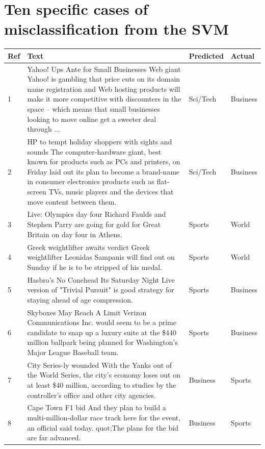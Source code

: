 \documentclass[12pt,a4paper,english]{article}
\begin{document}
\section{Ten specific cases of misclassification from the SVM}

\begin{table}[!h]
\begin{longtable}{| m{2em} | m{25em} | m{5em} | m{5em} |}
        \hline
        \textbf{Ref} & \textbf{Text} & \textbf{Predicted} & \textbf{Actual} \\ \hline

        \label{ref1} 1  & Yahoo! Ups Ante for Small Businesses Web giant Yahoo! is gambling that price cuts on its domain name registration and Web hosting products will make it more competitive with discounters in the space -- which means that small businesses looking to move online get a sweeter deal through ... & Sci/Tech & Business \\ \hline
\label{ref2} 2 & HP to tempt holiday shoppers with sights and sounds The computer-hardware giant, best known for products such as PCs and printers, on Friday laid out its plan to become a brand-name in consumer electronics products such as flat-screen TVs, music players and the devices that move content between them. & Sci/Tech & Business \\ \hline
3 \label{ref3} & Live: Olympics day four Richard Faulds and Stephen Parry are going for gold for Great Britain on day four in Athens. & Sports & World \\ \hline
4 \label{ref4} & Greek weightlifter awaits verdict Greek weightlifter Leonidas Sampanis will find out on Sunday if he is to be stripped of his medal. & Sports & World \\ \hline
5 \label{ref5} & Hasbro's No Conehead Its Saturday Night Live version of "Trivial Pursuit" is good strategy for staying ahead of age compression. & Sports & Business \\ \hline
6 \label{ref6} & Skyboxes May Reach A Limit Verizon Communications Inc. would seem to be a prime candidate to snap up a luxury suite at the \$440 million ballpark being planned for Washington's Major League Baseball team. & Sports & Business \\ \hline
7 \label{ref7} & City Series-ly wounded With the Yanks out of the World Series, the city's economy loses out on at least \$40 million, according to studies by the controller's office and other city agencies. & Business & Sports \\ \hline
8 \label{ref8} & Cape Town F1 bid And they plan to build a multi-million-dollar race track here for the event, an official said today. quot;The plans for the bid are far advanced. & Business & Sports \\ \hline

\end{longtable}
\end{table}
\end{document}
